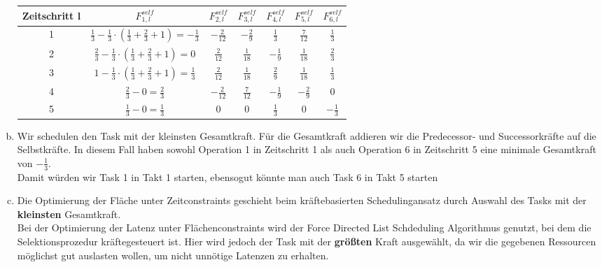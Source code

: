 \documentclass[a4paper]{scrartcl}
\begin{document}
\begin{enumerate}[(a)]
	\begin{tabular}{|c|c|c|c|c|c|c|}
		\hline 
		Zeitschritt l& $F_{1,l}^{self}$ & $F_{2,l}^{self}$ & $F_{3,l}^{self}$ & $F_{4,l}^{self}$ & $F_{5,l}^{self}$ & $F_{6,l}^{self}$ \\ 
		\hline 
		1& $\frac{1}{3}-\frac{1}{3}\cdot(\frac{1}{3}+\frac{2}{3}+1)=-\frac{1}{3}$ & $-\frac{2}{12}$ & $-\frac{2}{9}$ & $\frac{1}{3}$ & $\frac{7}{12}$ & $\frac{1}{3}$ \\ 
		\hline 
		2& $\frac{2}{3}-\frac{1}{3}\cdot(\frac{1}{3}+\frac{2}{3}+1)=0$ & $\frac{2}{12}$ & $\frac{1}{18}$ & $-\frac{1}{9}$ & $\frac{1}{18}$ & $\frac{2}{3}$ \\ 
		\hline 
		3& $1-\frac{1}{3}\cdot(\frac{1}{3}+\frac{2}{3}+1)=\frac{1}{3}$ & $\frac{2}{12}$ & $\frac{1}{18}$ & $\frac{2}{9}$ & $\frac{1}{18}$ & $\frac{1}{3}$ \\ 
		\hline 
		4& $\frac{2}{3}-0=\frac{2}{3}$ & $-\frac{2}{12}$ & $\frac{7}{12}$ & $-\frac{1}{9}$ & $-\frac{2}{9}$ & 0 \\ 
		\hline 
		5& $\frac{1}{3}-0=\frac{1}{3}$ & 0 & 0 & $\frac{1}{3}$ & 0 & $-\frac{1}{3}$ \\ 
		\hline 
	\end{tabular} 
	\item Wir schedulen den Task mit der kleinsten Gesamtkraft. Für die Gesamtkraft addieren wir die Predecessor- und Successorkräfte auf die Selbstkräfte. In diesem Fall haben sowohl Operation 1 in Zeitschritt 1 als auch Operation 6 in Zeitschritt 5 eine minimale Gesamtkraft von $-\frac{1}{3}$.\\
	Damit würden wir Task 1 in Takt 1 starten, ebensogut könnte man auch Task 6 in Takt 5 starten
	\item Die Optimierung der Fläche unter Zeitconstraints geschieht beim kräftebasierten Schedulingansatz durch Auswahl des Tasks mit der \textbf{kleinsten} Gesamtkraft.\\
	Bei der Optimierung der Latenz unter Flächenconstraints wird der Force Directed List Schdeduling Algorithmus genutzt, bei dem die Selektionsprozedur kräftegesteuert ist. Hier wird jedoch der Task mit der \textbf{größten} Kraft ausgewählt, da wir die gegebenen Ressourcen möglichst gut auslasten wollen, um nicht unnötige Latenzen zu erhalten.
\end{enumerate}

	
\end{document}
